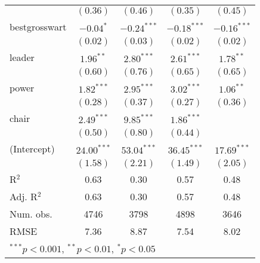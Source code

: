 \documentclass[12pt]{article}
\begin{document}
\begin{table}[H]
\begin{center}
\begin{tabular}{l c c c c }
			& $(0.36)$      & $(0.46)$      & $(0.35)$      & $(0.45)$      \\
			bestgrosswart          & $-0.04^{*}$   & $-0.24^{***}$ & $-0.18^{***}$ & $-0.16^{***}$ \\
			& $(0.02)$      & $(0.03)$      & $(0.02)$      & $(0.02)$      \\
			leader                 & $1.96^{**}$   & $2.80^{***}$  & $2.61^{***}$  & $1.78^{**}$   \\
			& $(0.60)$      & $(0.76)$      & $(0.65)$      & $(0.65)$      \\
			power                  & $1.82^{***}$  & $2.95^{***}$  & $3.02^{***}$  & $1.06^{**}$   \\
			& $(0.28)$      & $(0.37)$      & $(0.27)$      & $(0.36)$      \\
			chair                  & $2.49^{***}$  & $9.85^{***}$  & $1.86^{***}$  &               \\
			& $(0.50)$      & $(0.80)$      & $(0.44)$      &               \\
			(Intercept)            & $24.00^{***}$ & $53.04^{***}$ & $36.45^{***}$ & $17.69^{***}$ \\
			& $(1.58)$      & $(2.21)$      & $(1.49)$      & $(2.05)$      \\
			\hline
			R$^2$                  & 0.63          & 0.30          & 0.57          & 0.48          \\
			Adj. R$^2$             & 0.63          & 0.30          & 0.57          & 0.48          \\
			Num. obs.              & 4746          & 3798          & 4898          & 3646          \\
			RMSE                   & 7.36          & 8.87          & 7.54          & 8.02          \\
			\hline
			\multicolumn{5}{l}{\scriptsize{$^{***}p<0.001$, $^{**}p<0.01$, $^*p<0.05$}}
		\end{tabular}
	\end{center}
\end{table}
\end{document}
